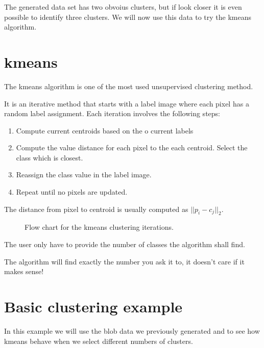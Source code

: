 \documentclass[letterpaper,10pt,english]{sphinxmanual}
\begin{document}
\noindent{}

The generated data set has two obvoius clusters, but if look closer it is even possible to identify three clusters. We will now use this data to try the k\sphinxhyphen{}means algorithm.


\section{k\sphinxhyphen{}means}
\label{\detokenize{ML4NeutronImageSegmentation:k-means}}
The k\sphinxhyphen{}means algorithm is one of the most used unsupervised clustering method.



It is an iterative method that starts with a label image where each pixel has a random label assignment. Each iteration involves the following steps:
\begin{enumerate}
%
\item {} 
Compute current centroids based on the o current labels

\item {} 
Compute the value distance for each pixel to the each centroid. Select the class which is closest.

\item {} 
Reassign the class value in the label image.

\item {} 
Repeat until no pixels are updated.

\end{enumerate}

The distance from pixel  to centroid  is usually computed as \(||p_i - c_j||_2\).

\begin{figure}[htbp]
\centering
\capstart

\noindent{}
\caption{Flow chart for the k\sphinxhyphen{}means clustering iterations.}\label{\detokenize{ML4NeutronImageSegmentation:id14}}\end{figure}

The user only have to provide the number of classes the algorithm shall find.

 The algorithm will find exactly the number you ask it to, it doesn’t care if it makes sense!


\section{Basic clustering example}
\label{\detokenize{ML4NeutronImageSegmentation:basic-clustering-example}}
In this example we will use the blob data we previously generated and to see how k\sphinxhyphen{}means behave when we select different numbers of clusters.
\end{document}

